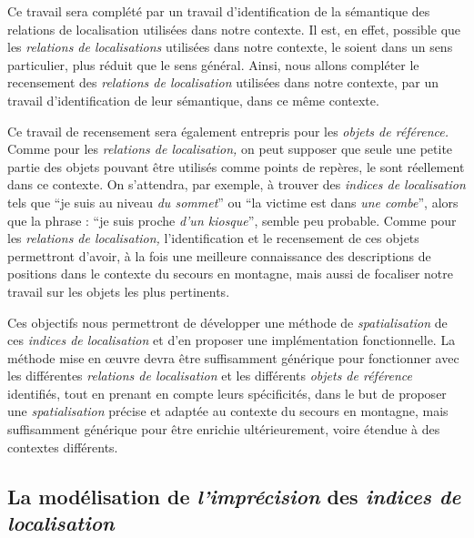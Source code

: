 Ce travail sera complété par un travail d'identification de la
sémantique des relations de localisation utilisées dans notre
contexte. Il est, en effet, possible que les \emph{relations de
  localisations} utilisées dans notre contexte, le soient dans un sens
particulier, plus réduit que le sens général. Ainsi, nous allons
compléter le recensement des \emph{relations de localisation}
utilisées dans notre contexte, par un travail d'identification de leur
sémantique, dans ce même contexte.

Ce travail de recensement sera également entrepris pour les
\emph{objets de référence.} Comme pour les \emph{relations de
  localisation,} on peut supposer que seule une petite partie des
objets pouvant être utilisés comme points de repères, le sont
réellement dans ce contexte. On s'attendra, par exemple, à trouver des
\emph{indices de localisation} tels que \enquote{je suis au niveau
  \emph{du sommet}} ou \enquote{la victime est dans \emph{une combe}},
alors que la phrase : \enquote{je suis proche \emph{d'un kiosque}},
semble peu probable. Comme pour les \emph{relations de localisation,}
l'identification et le recensement de ces objets permettront d'avoir,
à la fois une meilleure connaissance des descriptions de positions
dans le contexte du secours en montagne, mais aussi de focaliser notre
travail sur les objets les plus pertinents.

Ces objectifs nous permettront de développer une méthode de
\emph{spatialisation} de ces \emph{indices de localisation} et d'en
proposer une implémentation fonctionnelle. La méthode mise en œuvre
devra être suffisamment générique pour fonctionner avec les
différentes \emph{relations de localisation} et les différents
\emph{objets de référence} identifiés, tout en prenant en compte leurs
spécificités, dans le but de proposer une \emph{spatialisation}
précise et adaptée au contexte du secours en montagne, mais
suffisamment générique pour être enrichie ultérieurement, voire
étendue à des contextes différents.

\subsection{La modélisation de \emph{l'imprécision} des \emph{indices
    de localisation}}
\label{subsec:2-1-2}


